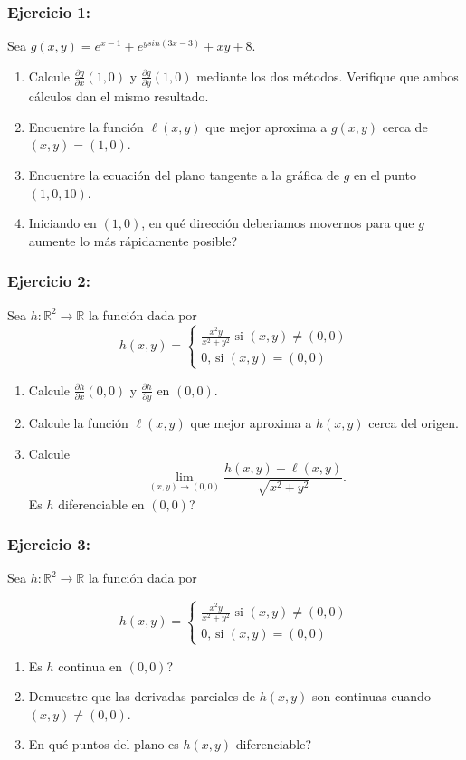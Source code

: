\documentclass{beamer}
\begin{document}
\begin{frame}
\frametitle{Ejercicio 1:}
Sea $g(x,y)= e^{x-1}+e^{ysin(3x-3)} +xy +8$.

\begin{enumerate}
\item Calcule $\frac{\partial g}{\partial x}(1,0)$ y $\frac{\partial g}{\partial y}(1,0)$ mediante los dos m\'etodos. Verifique que ambos c\'alculos dan el mismo resultado. 
\item Encuentre la funci\'on $\ell(x,y)$ que mejor aproxima a $g(x,y)$ cerca de $(x,y)=(1,0)$.

\item Encuentre la ecuaci\'on del plano tangente a la gr\'afica de $g$ en el punto $(1,0,10)$.
\item Iniciando en $(1,0)$, en qu\'e direcci\'on deberiamos movernos para que $g$ aumente lo m\'as r\'apidamente posible?

\end{enumerate}
\end{frame}



\begin{frame}
\frametitle{Ejercicio 2:}
Sea $h:\mathbb{R}^2\rightarrow \mathbb{R}$ la funci\'on dada por
\[h(x,y)=\begin{cases}
\frac{x^2y}{x^2+y^2}\text{ si $(x,y)\neq (0,0)$}\\
0\text{, si $(x,y)=(0,0)$}
\end{cases}
\]

\begin{enumerate}
\item Calcule $\frac{\partial h}{\partial x}(0,0)$ y $\frac{\partial h}{\partial y}$ en $(0,0)$.
\item Calcule la funci\'on $\ell(x,y)$ que mejor aproxima a $h(x,y)$ cerca del origen.
\item Calcule 
\[\lim_{(x,y)\rightarrow (0,0)} \frac{h(x,y)-\ell(x,y)}{\sqrt{x^2+y^2}}.\]
Es $h$ diferenciable en $(0,0)$?
\end{enumerate}
\end{frame}

\begin{frame}
\frametitle{Ejercicio 3:}
Sea $h:\mathbb{R}^2\rightarrow \mathbb{R}$ la funci\'on dada por

\[h(x,y)=\begin{cases}
\frac{x^2y}{x^2+y^2}\text{ si $(x,y)\neq (0,0)$}\\
0\text{, si $(x,y)=(0,0)$}
\end{cases}
\]
\begin{enumerate}
\item Es $h$ continua en $(0,0)$?
\item Demuestre que las derivadas parciales de $h(x,y)$ son continuas cuando $(x,y)\neq (0,0)$.
\item En qu\'e puntos del plano es $h(x,y)$ diferenciable?
\end{enumerate}
\end{frame}
\end{document}
